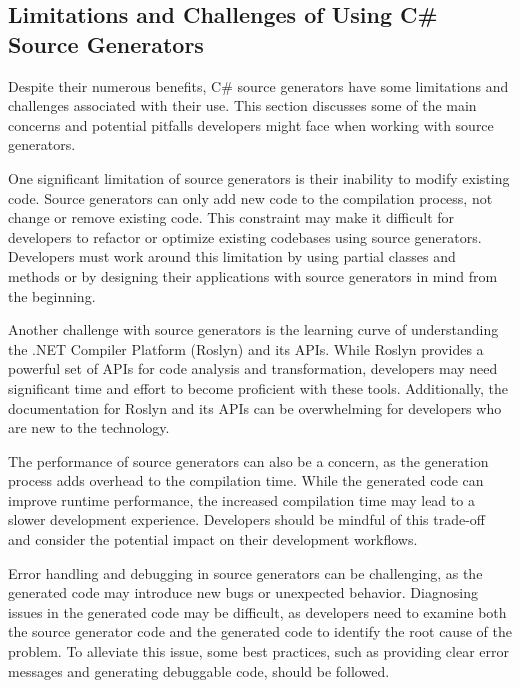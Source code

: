 \subsection{Limitations and Challenges of Using C\# Source Generators}

Despite their numerous benefits, C\# source generators have some limitations and challenges associated with their use. This section discusses some of the main concerns and potential pitfalls developers might face when working with source generators.

One significant limitation of source generators is their inability to modify existing code\cite{Microsoft2022SourceGenerators}. Source generators can only add new code to the compilation process, not change or remove existing code. This constraint may make it difficult for developers to refactor or optimize existing codebases using source generators. Developers must work around this limitation by using partial classes and methods or by designing their applications with source generators in mind from the beginning\cite{Bolognese2021UsingBlog}.

Another challenge with source generators is the learning curve of understanding the .NET Compiler Platform (Roslyn) and its APIs\cite{MicrosoftThePlatform}. While Roslyn provides a powerful set of APIs for code analysis and transformation, developers may need significant time and effort to become proficient with these tools. Additionally, the documentation for Roslyn and its APIs can be overwhelming for developers who are new to the technology\cite{Microsoft2021TheLearn}.

The performance of source generators can also be a concern, as the generation process adds overhead to the compilation time\cite{Microsoft2022SourceGenerators}. While the generated code can improve runtime performance, the increased compilation time may lead to a slower development experience. Developers should be mindful of this trade-off and consider the potential impact on their development workflows.

Error handling and debugging in source generators can be challenging, as the generated code may introduce new bugs or unexpected behavior\cite{Microsoft2022SourceGenerators}. Diagnosing issues in the generated code may be difficult, as developers need to examine both the source generator code and the generated code to identify the root cause of the problem. To alleviate this issue, some best practices, such as providing clear error messages and generating debuggable code, should be followed\cite{Bolognese2021UsingBlog}.

